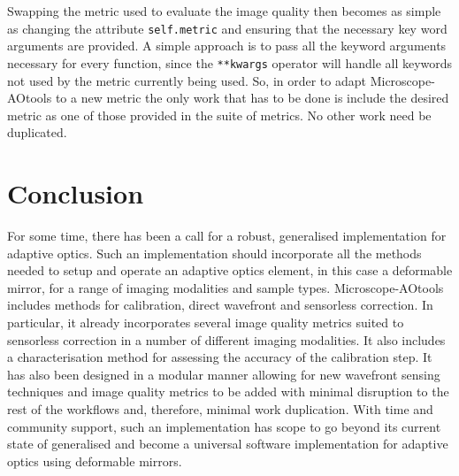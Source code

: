 Swapping the metric used to evaluate the image quality then becomes as simple as changing the attribute \lstinline|self.metric| and ensuring that the necessary key word arguments are provided. A simple approach is to pass all the keyword arguments necessary for every function, since the \lstinline|**kwargs| operator will handle all keywords not used by the metric currently being used. So, in order to adapt Microscope-AOtools to a new metric the only work that has to be done is include the desired metric as one of those provided in the suite of metrics. No other work need be duplicated. 

\section{Conclusion}

For some time, there has been a call for a robust, generalised implementation for adaptive optics. Such an implementation should incorporate all the methods needed to setup and operate an adaptive optics element, in this case a deformable mirror, for a range of imaging modalities and sample types. Microscope-AOtools includes methods for calibration, direct wavefront and sensorless correction. In particular, it already incorporates several image quality metrics suited to sensorless correction in a number of different imaging modalities. It also includes a characterisation method for assessing the accuracy of the calibration step. It has also been designed in a modular manner allowing for new wavefront sensing techniques and image quality metrics to be added with minimal disruption to the rest of the workflows and, therefore, minimal work duplication. With time and community support, such an implementation has scope to go beyond its current state of generalised and become a universal software implementation for adaptive optics using deformable mirrors.